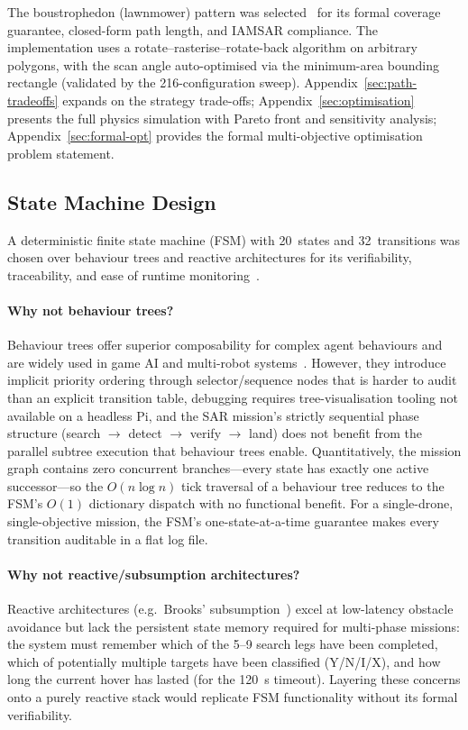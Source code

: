 \noindent The boustrophedon (lawnmower) pattern was selected~\cite{choset2001coverage, galceran2013survey} for its formal coverage guarantee, closed-form path length, and IAMSAR compliance. The implementation uses a rotate--rasterise--rotate-back algorithm on arbitrary polygons, with the scan angle auto-optimised via the minimum-area bounding rectangle (validated by the 216-configuration sweep). Appendix~\ref{sec:path-tradeoffs} expands on the strategy trade-offs; Appendix~\ref{sec:optimisation} presents the full physics simulation with Pareto front and sensitivity analysis; Appendix~\ref{sec:formal-opt} provides the formal multi-objective optimisation problem statement.

\subsection{State Machine Design}\label{sec:fsm-rationale}

A deterministic finite state machine (FSM) with 20~states and 32~transitions was chosen over behaviour trees and reactive architectures for its verifiability, traceability, and ease of runtime monitoring~\cite{wagner2006fsm}.

\paragraph{Why not behaviour trees?} Behaviour trees offer superior composability for complex agent behaviours and are widely used in game AI and multi-robot systems~\cite{colosseum2017bt}. However, they introduce implicit priority ordering through selector/sequence nodes that is harder to audit than an explicit transition table, debugging requires tree-visualisation tooling not available on a headless Pi, and the SAR mission's strictly sequential phase structure (search $\rightarrow$ detect $\rightarrow$ verify $\rightarrow$ land) does not benefit from the parallel subtree execution that behaviour trees enable. Quantitatively, the mission graph contains zero concurrent branches---every state has exactly one active successor---so the $O(n\log n)$ tick traversal of a behaviour tree reduces to the FSM's $O(1)$ dictionary dispatch with no functional benefit. For a single-drone, single-objective mission, the FSM's one-state-at-a-time guarantee makes every transition auditable in a flat log file.

\paragraph{Why not reactive/subsumption architectures?} Reactive architectures (e.g.\ Brooks' subsumption~\cite{brooks1986subsumption}) excel at low-latency obstacle avoidance but lack the persistent state memory required for multi-phase missions: the system must remember which of the 5--9 search legs have been completed, which of potentially multiple targets have been classified (Y/N/I/X), and how long the current hover has lasted (for the \SI{120}{\second} timeout). Layering these concerns onto a purely reactive stack would replicate FSM functionality without its formal verifiability.

